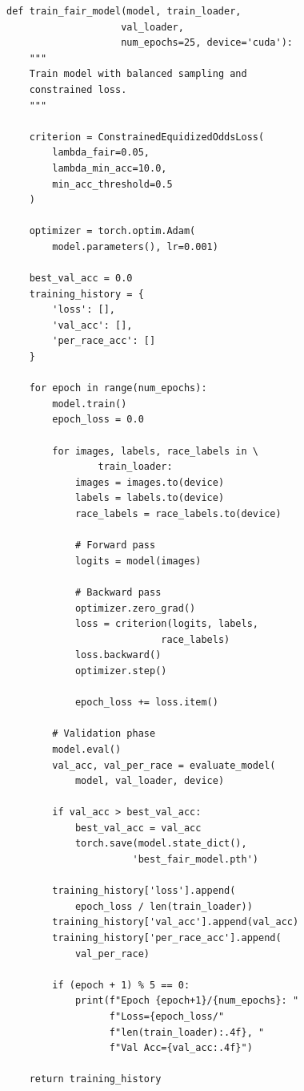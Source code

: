 \documentclass[11pt,a4paper,oneside]{report}
\begin{document}
\begin{lstlisting}[caption=Fair Model Training Procedure]
def train_fair_model(model, train_loader, 
                    val_loader, 
                    num_epochs=25, device='cuda'):
    """
    Train model with balanced sampling and 
    constrained loss.
    """
    
    criterion = ConstrainedEquidizedOddsLoss(
        lambda_fair=0.05,
        lambda_min_acc=10.0,
        min_acc_threshold=0.5
    )
    
    optimizer = torch.optim.Adam(
        model.parameters(), lr=0.001)
    
    best_val_acc = 0.0
    training_history = {
        'loss': [], 
        'val_acc': [], 
        'per_race_acc': []
    }
    
    for epoch in range(num_epochs):
        model.train()
        epoch_loss = 0.0
        
        for images, labels, race_labels in \
                train_loader:
            images = images.to(device)
            labels = labels.to(device)
            race_labels = race_labels.to(device)
            
            # Forward pass
            logits = model(images)
            
            # Backward pass
            optimizer.zero_grad()
            loss = criterion(logits, labels, 
                           race_labels)
            loss.backward()
            optimizer.step()
            
            epoch_loss += loss.item()
        
        # Validation phase
        model.eval()
        val_acc, val_per_race = evaluate_model(
            model, val_loader, device)
        
        if val_acc > best_val_acc:
            best_val_acc = val_acc
            torch.save(model.state_dict(), 
                      'best_fair_model.pth')
        
        training_history['loss'].append(
            epoch_loss / len(train_loader))
        training_history['val_acc'].append(val_acc)
        training_history['per_race_acc'].append(
            val_per_race)
        
        if (epoch + 1) % 5 == 0:
            print(f"Epoch {epoch+1}/{num_epochs}: "
                  f"Loss={epoch_loss/"
                  f"len(train_loader):.4f}, "
                  f"Val Acc={val_acc:.4f}")
    
    return training_history
\end{lstlisting}
\end{document}
